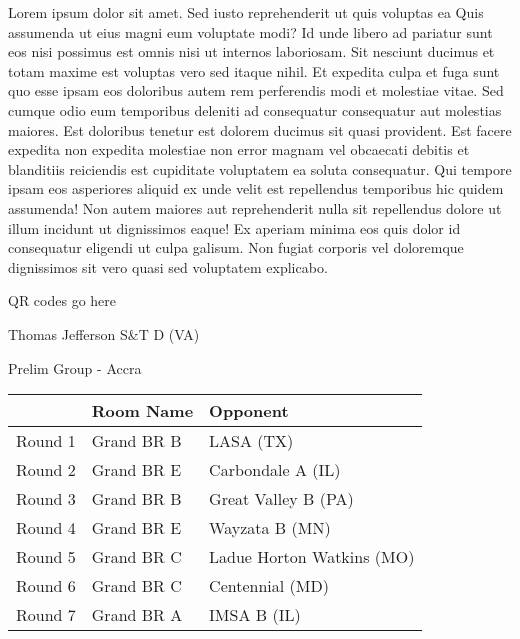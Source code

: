 \documentclass{article}%
\begin{document}
\vspace*{8pt}%
\linebreak%
\newline%
\newline%
Lorem ipsum dolor sit amet. Sed iusto reprehenderit ut quis voluptas ea Quis assumenda ut eius magni eum voluptate modi? Id unde libero ad pariatur sunt eos nisi possimus est omnis nisi ut internos laboriosam. Sit nesciunt ducimus et totam maxime est voluptas vero sed itaque nihil. Et expedita culpa et fuga sunt quo esse ipsam eos doloribus autem rem perferendis modi et molestiae vitae.\newline%
\newline%
Sed cumque odio eum temporibus deleniti ad consequatur consequatur aut molestias maiores. Est doloribus tenetur est dolorem ducimus sit quasi provident. Est facere expedita non expedita molestiae non error magnam vel obcaecati debitis et blanditiis reiciendis est cupiditate voluptatem ea soluta consequatur. Qui tempore ipsam eos asperiores aliquid ex unde velit est repellendus temporibus hic quidem assumenda!\newline%
\newline%
Non autem maiores aut reprehenderit nulla sit repellendus dolore ut illum incidunt ut dignissimos eaque! Ex aperiam minima eos quis dolor id consequatur eligendi ut culpa galisum. Non fugiat corporis vel doloremque dignissimos sit vero quasi sed voluptatem explicabo.\newline%
\newline%
%
\vspace*{30pt}%
\begin{center}%
\begin{Huge}%
QR codes go here%
\end{Huge}%
\end{center}%
\newpage%
%
\begin{center}%
\begin{Huge}%
Thomas Jefferson S\&T D (VA)%
\end{Huge}%
\vspace*{8pt}%
\linebreak%
\begin{Large}%
Prelim Group {-} Accra%
\end{Large}%
\end{center}%
\begin{tabularx}{\textwidth}{|c|Y|Y|}%
\hline%
&Room Name&Opponent\\%
\hline%
Round 1&Grand BR B&LASA (TX)\\%
Round 2&Grand BR E&Carbondale A (IL)\\%
Round 3&Grand BR B&Great Valley B (PA)\\%
Round 4&Grand BR E&Wayzata B (MN)\\%
Round 5&Grand BR C&Ladue Horton Watkins (MO)\\%
Round 6&Grand BR C&Centennial (MD)\\%
Round 7&Grand BR A&IMSA B (IL)\\%
\hline%
\end{tabularx}%
\end{document}
